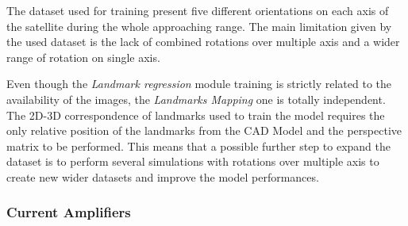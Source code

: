 The dataset used for training present five different orientations on each axis of the satellite during the whole approaching range. The main limitation given by the used dataset is the lack of combined rotations over multiple axis and a wider range of rotation on single axis.

Even though the \textit{Landmark regression} module training is strictly related to the availability of the images, the \textit{Landmarks Mapping} one is totally independent. The 2D-3D correspondence of landmarks used to train the model requires the only relative position of the landmarks from the CAD Model and the perspective matrix to be performed. This means that a possible further step to expand the dataset is to perform several simulations with rotations over multiple axis to create new wider datasets and improve the model performances.

\subsubsection{Current Amplifiers}
